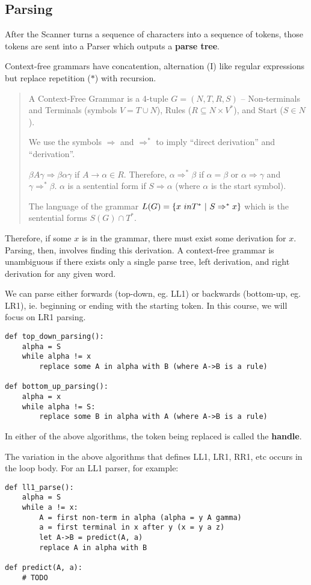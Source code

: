 \documentclass[12pt]{article}
\begin{document}
\subsection{Parsing}
After the Scanner turns a sequence of characters into a sequence of tokens, those tokens are sent into a Parser which outputs a {\bf parse tree}.

Context-free grammars have concatention, alternation (I) like regular expressions but replace repetition ($*$) with recursion.

\begin{quote}
A Context-Free Grammar is a 4-tuple $G = (N, T, R, S)$ -- Non-terminals and Terminals (symbols $V = T \cup N$), Rules ($R \subseteq N \times V^*$), and Start ($S \in N$).

We use the symbols $\Rightarrow$ and $\Rightarrow^*$ to imply ``direct derivation'' and ``derivation''.

$\beta A \gamma \Rightarrow \beta\alpha\gamma$ if $A \to \alpha \in R$. Therefore, $\alpha \Rightarrow^* \beta$ if $\alpha = \beta$ or $\alpha \Rightarrow \gamma$ and $\gamma \Rightarrow^* \beta$. $\alpha$ is a sentential form if $S \Rightarrow \alpha$ (where $\alpha$ is the start symbol).

The language of the grammar $L(G) = \{ x\ in T^* \suchthat S \Rightarrow^* x \}$ which is the sentential forms $S(G) \cap T^*$.
\end{quote}

Therefore, if some $x$ is in the grammar, there must exist some derivation for $x$. Parsing, then, involves finding this derivation. A context-free grammar is unambiguous if there exists only a single parse tree, left derivation, and right derivation for any given word.

We can parse either forwards (top-down, eg. LL1) or backwards (bottom-up, eg. LR1), ie. beginning or ending with the starting token. In this course, we will focus on LR1 parsing.

\begin{verbatim}
def top_down_parsing():
    alpha = S
    while alpha != x
        replace some A in alpha with B (where A->B is a rule)

def bottom_up_parsing():
    alpha = x
    while alpha != S:
        replace some B in alpha with A (where A->B is a rule)
\end{verbatim}

In either of the above algorithms, the token being replaced is called the {\bf handle}.

The variation in the above algorithms that defines LL1, LR1, RR1, etc occurs in the loop body. For an LL1 parser, for example:
\begin{verbatim}
def ll1_parse():
    alpha = S
    while a != x:
        A = first non-term in alpha (alpha = y A gamma)
        a = first terminal in x after y (x = y a z)
        let A->B = predict(A, a)
        replace A in alpha with B

def predict(A, a):
    # TODO
\end{verbatim}
\end{document}
